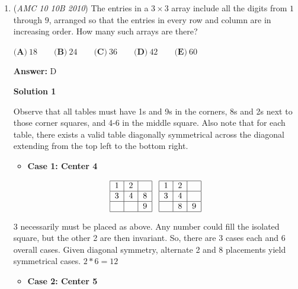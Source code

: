 \begin{enumerate}
	\item (\textit{AMC 10 10B 2010}) The entries in a $3 \times 3$ array include all the digits from $1$ through $9$, arranged so that the entries in every row and column are in increasing order. How many such arrays are there?


 $\textbf{(A)}\ 18 \qquad \textbf{(B)}\ 24 \qquad \textbf{(C)}\ 36 \qquad \textbf{(D)}\ 42 \qquad \textbf{(E)}\ 60$

 \textbf{Answer: }D



\textbf{Solution 1}

Observe that all tables must have 1s and 9s in the corners, 8s and 2s next to those corner squares, and 4-6 in the middle square. Also note that for each table, there exists a valid table diagonally symmetrical across the diagonal extending from the top left to the bottom right. 

 


 
            \begin{itemize}
        \item \textbf{Case 1: Center 4}
            \end{itemize}
            
 \[\begin{tabular}{|c|c|c|} \hline 1&2&\\ \hline 3&4&8\\ \hline &&9\\ \hline \end{tabular} \;\;\; \begin{tabular}{|c|c|c|} \hline 1&2&\\ \hline 3&4&\\ \hline &8&9\\ \hline \end{tabular}\]

 3 necessarily must be placed as above. Any number could fill the isolated square, but the other 2 are then invariant. So, there are 3 cases each and 6 overall cases. Given diagonal symmetry, alternate 2 and 8 placements yield symmetrical cases. $2*6=12$

            \begin{itemize}
        \item \textbf{Case 2: Center 5}
            \end{itemize}
            

\end{enumerate}
